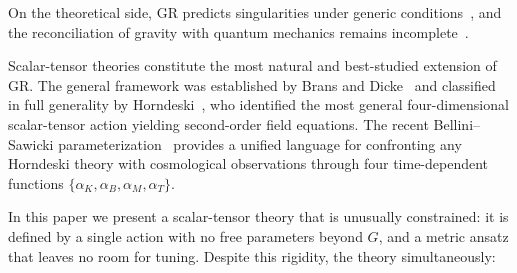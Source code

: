 \documentclass[aps,prd,onecolumn,superscriptaddress,nofootinbib,showpacs,12pt]{revtex4-2}
\begin{document}
On the theoretical side, GR predicts singularities under generic
conditions~\cite{Penrose1965,Hawking1970}, and the reconciliation
of gravity with quantum mechanics remains
incomplete~\cite{DeWitt1967,tHooft1974}.

Scalar-tensor theories constitute the most natural and
best-studied extension of GR.  The general framework was
established by Brans and Dicke~\cite{BransDicke1961} and
classified in full generality by Horndeski~\cite{Horndeski1974},
who identified the most general four-dimensional scalar-tensor
action yielding second-order field equations.  The recent
Bellini--Sawicki parameterization~\cite{BelliniSawicki2014}
provides a unified language for confronting any Horndeski
theory with cosmological observations through four
time-dependent functions $\{\alpha_{K},\alpha_{B},
\alpha_{M},\alpha_{T}\}$.

In this paper we present a scalar-tensor theory that is
unusually constrained: it is defined by a single action
with no free parameters beyond $G$, and a metric ansatz
that leaves no room for tuning.  Despite this rigidity,
the theory simultaneously:
\end{document}
